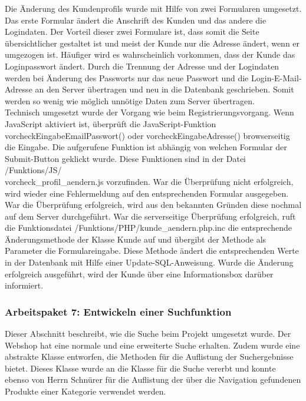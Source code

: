 Die Änderung des Kundenprofils wurde mit Hilfe von zwei Formularen umgesetzt. Das erste Formular ändert die Anschrift des Kunden und das andere die Logindaten. Der Vorteil dieser zwei Formulare ist, dass somit die Seite übersichtlicher gestaltet ist und meist der Kunde  nur die Adresse ändert, wenn er umgezogen ist. Häufiger wird es wahrscheinlich vorkommen, dass der Kunde das Loginpasswort ändert. Durch die Trennung der Adresse und der Logindaten werden bei Änderung des Passworts nur das neue Passwort und die Login-E-Mail-Adresse an den Server übertragen und neu in die Datenbank geschrieben. Somit werden so wenig wie möglich unnötige Daten zum Server übertragen.\\
Technisch umgesetzt wurde der Vorgang wie beim Registrierungsvorgang. Wenn JavaScript aktiviert ist, überprüft die JavaScript-Funktion \glqq vorcheckEingabeEmailPasswort()\grqq{} oder \glqq vorcheckEingabeAdresse()\grqq{} browserseitig die Eingabe. Die aufgerufene Funktion ist abhängig von welchen Formular der Submit-Button geklickt wurde. Diese Funktionen sind in der Datei \glqq /Funktions/JS/ \\ vorcheck\_profil\_aendern.js\grqq{} vorzufinden. War die Überprüfung nicht erfolgreich, wird wieder eine Fehlermeldung auf den entsprechenden Formular ausgegeben. War die Überprüfung erfolgreich, wird aus den bekannten Gründen diese nochmal auf dem Server durchgeführt. War die serverseitige Überprüfung erfolgreich, ruft die Funktionsdatei \glqq /Funktions/PHP/kunde\_aendern.php.inc\grqq{} die entsprechende Änderungsmethode der Klasse \glqq Kunde\grqq{} auf und übergibt der Methode als Parameter die Formulareingabe. Diese Methode ändert die entsprechenden Werte in der Datenbank mit Hilfe einer Update-SQL-Anweisung. Wurde die Änderung erfolgreich ausgeführt, wird der Kunde über eine Informationsbox darüber informiert.

\subsubsection{Arbeitspaket 7: Entwickeln einer Suchfunktion}
Dieser Abschnitt beschreibt, wie die Suche beim Projekt umgesetzt wurde. Der Webshop hat eine \glqq normale\grqq{} und eine \glqq erweiterte\grqq{} Suche erhalten. Zudem wurde eine abstrakte Klasse entworfen, die Methoden für die Auflistung der Suchergebnisse bietet. Dieses Klasse wurde an die Klasse für die Suche vererbt und konnte ebenso von Herrn Schnürer für die Auflistung der über die Navigation gefundenen Produkte einer Kategorie verwendet werden.\\

